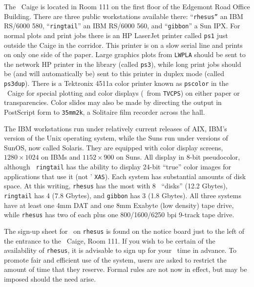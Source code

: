 \vfill\eject


     The  \AIPS\ Caige is located in Room 111 on
the first floor of the Edgemont Road Office Building.  There are three
public workstations available there: ``{\tt rhesus''} an IBM RS/6000
580, ``{\tt ringtail}'' an IBM RS/6000 560, and ``{\tt gibbon}'' a Sun
\hbox{IPX}.  For normal plots and print jobs there is an HP LaserJet
printer called {\tt ps1} just outside the Caige in the corridor.  This
printer is on a slow serial line and prints on only one side of the
paper.  Large graphics plots from {\tt LWPLA} should be sent to the
network HP printer in the library (called {\tt ps3}), while long print
jobs should be (and will automatically be) sent to this printer in
duplex mode (called {\tt ps3dup}).  There is a Tektronix 4511a color
printer known as {\tt pscolor} in the \AIPS\ Caige for special
plotting and color displays (\eg\ from {\tt TVCPS}) on either paper or
transparencies.  Color slides may also be made by directing the output
in PostScript form to {\tt 35mm2k}, a Solitaire film recorder across
the hall.

     The IBM workstations run under relatively current releases of
AIX, IBM's version of the Unix operating system, while the Suns run
under versions of SunOS, now called Solaris.  They are equipped with
color display screens, $1280 \times 1024$ on IBMs and $1152 \times
900$ on Suns.  All display in 8-bit pseudocolor, although {\tt
ringtail} has the ability to display 24-bit ``true'' color images for
applications that use it (not \AIPS' \hbox{{\tt XAS}}).  Each system
has substantial amounts of disk space.  At this writing, {\tt rhesus}
has the most with 8 \AIPS\ ``disks'' (12.2 Gbytes), {\tt ringtail} has
4 (7.8 Gbytes), and {\tt gibbon} has 3 (1.8 Gbytes).  All three
systems have at least one 4mm DAT and one 8mm Exabyte (low density)
tape drive, while {\tt rhesus} has two of each plus one 800/1600/6250
bpi 9-track tape drive.



     The sign-up sheet for \AIPS\ on {\tt rhesus} is found on the
notice board just to the left of the entrance to the \AIPS\ Caige, Room
111.  If you wish to be certain of the availability of {\tt rhesus},
it is advisable to sign up for your \AIPS\ time in advance.  To
promote fair and efficient use of the system, users are asked to
restrict the amount of time that they reserve.  Formal rules are not
now in effect, but may be imposed should the need arise.

